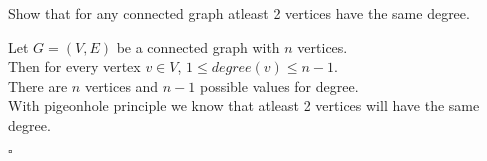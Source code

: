 \documentclass{exam}
\begin{document}
\begin{questions}
    \question Show that for any connected graph atleast 2 vertices have the same degree.
    \begin{solution}
        Let $G = (V,E)$ be a connected graph with $n$ vertices.
        \\Then for every vertex $v \in V$, $1 \leq degree(v) \leq n-1$.
        \\There are $n$ vertices and $n-1$ possible values for degree. 
        \\With pigeonhole principle we know that atleast 2 vertices will have the same degree.
        \begin{flushright}
            $\square$
        \end{flushright}
    \end{solution}

    \question 
    
\end{questions}
\end{document}
